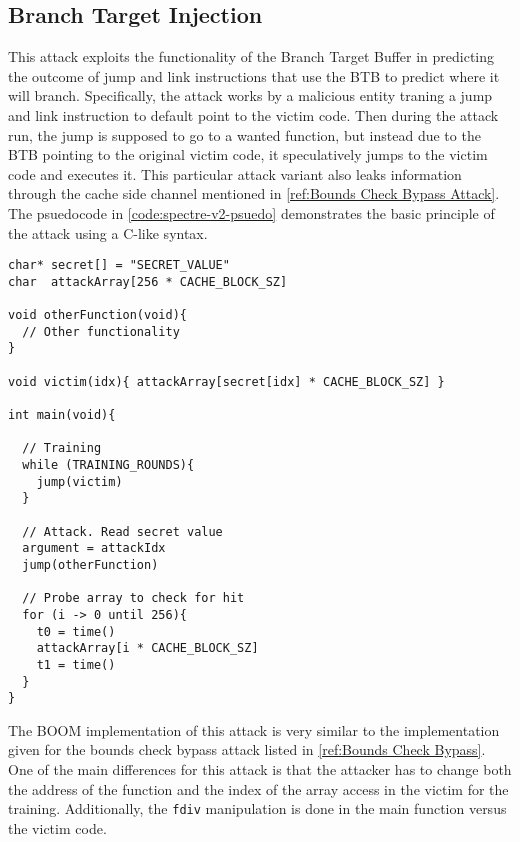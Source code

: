 \subsection{Branch Target Injection}

This attack exploits the functionality of the Branch Target Buffer in predicting the outcome
of jump and link instructions that use the BTB to predict where it will branch. Specifically, 
the attack works by a malicious entity traning a jump and link instruction to default point to 
the victim code. Then during the attack run, the jump is supposed to go to a wanted function,
but instead due to the BTB pointing to the original victim code, it speculatively jumps to the
victim code and executes it. This particular attack variant also leaks information through the
cache side channel mentioned in \ref{ref:Bounds Check Bypass Attack}. The psuedocode in 
\ref{code:spectre-v2-psuedo} demonstrates the basic principle of the attack using a C-like syntax.

\begin{lstlisting}[style=column-code, caption=Psuedocode of Bounds Check Bypass Attack]
char* secret[] = "SECRET_VALUE"
char  attackArray[256 * CACHE_BLOCK_SZ]

void otherFunction(void){
  // Other functionality    
}

void victim(idx){ attackArray[secret[idx] * CACHE_BLOCK_SZ] }

int main(void){
  
  // Training
  while (TRAINING_ROUNDS){
    jump(victim)
  }

  // Attack. Read secret value
  argument = attackIdx
  jump(otherFunction)

  // Probe array to check for hit
  for (i -> 0 until 256){
    t0 = time()
    attackArray[i * CACHE_BLOCK_SZ]
    t1 = time()
  }
}
\end{lstlisting}\label{code:spectre-v1-pseudo}

The BOOM implementation of this attack is very similar to the implementation given for
the bounds check bypass attack listed in \ref{ref:Bounds Check Bypass}. One of the main differences
for this attack is that the attacker has to change both the address of the function and the
index of the array access in the victim for the training. Additionally, the {\tt fdiv} manipulation is 
done in the main function versus the victim code.
